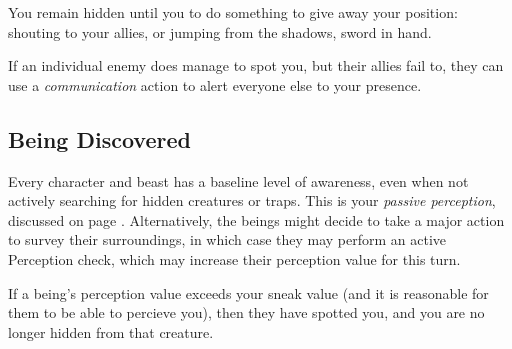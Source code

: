 You remain hidden until you to do something to give away your position: shouting to your allies, or jumping from the shadows, sword in hand. 

If an individual enemy does manage to spot you, but their allies fail to, they can use a {\it communication} action to alert everyone else to your presence. 


\subsection{Being Discovered}

Every character and beast has a baseline level of awareness, even when not actively searching for hidden creatures or traps. This is your {\it passive perception}, discussed on page \pageref{S:PassivePerception}.
Alternatively, the beings might decide to take a major action to survey their surroundings, in which case they may perform an active Perception check, which may increase their perception value for this turn. 

If a being's perception value exceeds your sneak value (and it is reasonable for them to be able to percieve you), then they have spotted you, and you are no longer hidden from that creature.  




